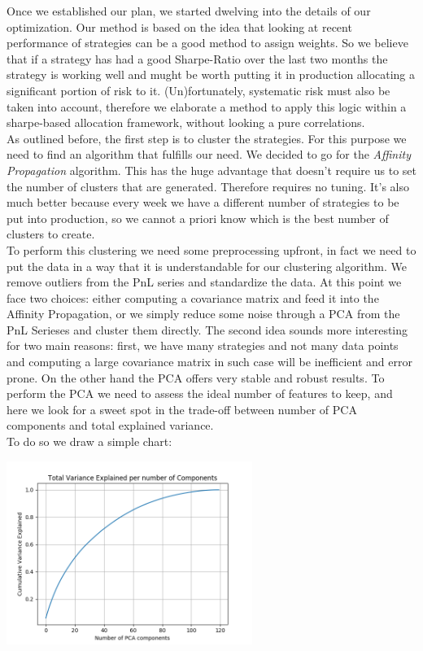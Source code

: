 Once we established our plan, we started dwelving into the details of our optimization. Our method is based on the idea that looking at recent performance of strategies can be a good method to assign weights. So we believe that if a strategy has had a good Sharpe-Ratio over the last two months the strategy is working well and mught be worth putting it in production allocating a significant portion of risk to it. (Un)fortunately, systematic risk must also be taken into account, therefore we elaborate a method to apply this logic within a sharpe-based allocation framework, without looking a pure correlations.\\
As outlined before, the first step is to cluster the strategies. For this purpose we need to find an algorithm that fulfills our need. We decided to go for the \textit{Affinity Propagation} algorithm. This has the huge advantage that doesn't require us to set the number of clusters that are generated. Therefore requires no tuning. It's also much better because every week we have a different number of strategies to be put into production, so we cannot a priori know which is the best number of clusters to create.\\
To perform this clustering we need some preprocessing upfront, in fact we need to put the data in a way that it is understandable for our clustering algorithm. We remove outliers from the PnL series and standardize the data. At this point we face two choices: either computing a covariance matrix and feed it into the Affinity Propagation, or we simply reduce some noise through a PCA from the PnL Serieses and cluster them directly. The second idea sounds more interesting for two main reasons: first, we have many strategies and not many data points and computing a large covariance matrix in such case will be inefficient and error prone. On the other hand the PCA offers very stable and robust results. To perform the PCA we need to assess the ideal number of features to keep, and here we look for a sweet spot in the trade-off between number of PCA components and total explained variance.\\
To do so we draw a simple chart:

\begin{center}
	\centering
	\includegraphics[width=0.6\textwidth]{HRP/PCA_Components.png}
	\label{CRP_PCA}
\end{center}

